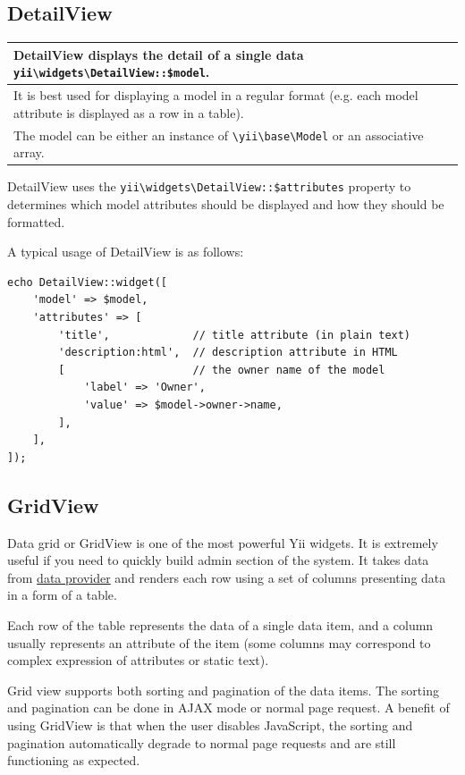 \subsection{DetailView}

\noindent\begin{tabular}{|l|}\hline
DetailView displays the detail of a single data \texttt{yii{\allowbreak{}\textbackslash}widgets{\allowbreak{}\textbackslash}DetailView\allowbreak{}::\allowbreak{}\$model}.\\ \hline
It is best used for displaying a model in a regular format (e.g. each model attribute is displayed as a row in a table).\\ \hline
The model can be either an instance of \texttt{{\allowbreak{}\textbackslash}yii{\allowbreak{}\textbackslash}base{\allowbreak{}\textbackslash}Model} or an associative array.\\ \hline
\end{tabular}
DetailView uses the \texttt{yii{\allowbreak{}\textbackslash}widgets{\allowbreak{}\textbackslash}DetailView\allowbreak{}::\allowbreak{}\$attributes} property to determines which model attributes should be displayed and how they
should be formatted.

A typical usage of DetailView is as follows:

\lstset{language=php}\begin{lstlisting}
echo DetailView::widget([
    'model' => $model,
    'attributes' => [
        'title',             // title attribute (in plain text)
        'description:html',  // description attribute in HTML
        [                    // the owner name of the model
            'label' => 'Owner',
            'value' => $model->owner->name,
        ],
    ],
]);
\end{lstlisting}
\subsection{GridView}
Data grid or GridView is one of the most powerful Yii widgets. It is extremely useful if you need to quickly build admin
section of the system. It takes data from \hyperref[data-providers.md]{data provider} and renders each row using a set of columns
presenting data in a form of a table.

Each row of the table represents the data of a single data item, and a column usually represents an attribute of
the item (some columns may correspond to complex expression of attributes or static text).

Grid view supports both sorting and pagination of the data items. The sorting and pagination can be done in AJAX mode
or normal page request. A benefit of using GridView is that when the user disables JavaScript, the sorting and pagination
automatically degrade to normal page requests and are still functioning as expected.

